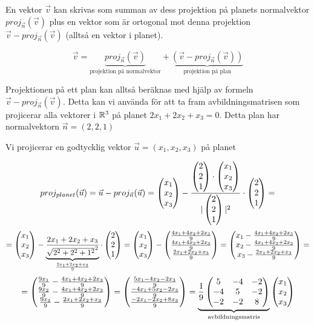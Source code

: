 \documentclass[../../main.tex]{subfiles}
\begin{document}
\begin{solution}{10}

En vektor $\vec{v}$ kan skrivas som summan av dess projektion på planets normalvektor $proj_{\vec{n}}(\vec{v})$ plus en vektor som är ortogonal mot denna projektion $\vec{v} - proj_{\vec{n}}(\vec{v})$ (alltså en vektor i planet). 

$$
\vec{v} = \underbrace{proj_{\vec{n}}(\vec{v})}_{\text{projektion på normalvektor}} + \underbrace{(\vec{v} - proj_{\vec{n}}(\vec{v}))}_{\text{projektion på plan}}
$$

Projektionen på ett plan kan alltså beräknas med hjälp av formeln $\vec{v} - proj_{\vec{n}}(\vec{v})$. Detta kan vi använda för att ta fram avbildningsmatrisen som projicerar alla vektorer i $\mathbb{R}^{3}$ på planet $2x_1 + 2x_2 + x_3 = 0$. Detta plan har normalvektorn $\vec{n} = (2, 2, 1)$

Vi projicerar en godtycklig vektor $\vec{u} = (x_1, x_2, x_3)$ på planet

$$
proj_{planet}(\vec{u}) = \vec{u} - proj_{\vec{n}}(\vec{u}) = \begin{pmatrix}x_1\\x_2\\x_3\end{pmatrix} - \frac{\begin{pmatrix}2\\2\\1\end{pmatrix}\cdot \begin{pmatrix}x_1\\x_2\\x_3\end{pmatrix}}{|\begin{pmatrix}2\\2\\1\end{pmatrix}|^2} \cdot \begin{pmatrix}2\\2\\1\end{pmatrix} =
$$
$$
= \begin{pmatrix}x_1\\x_2\\x_3\end{pmatrix} - \underbrace{\frac{2x_1 + 2x_2 + x_3}{\sqrt{2^2 + 2^2 + 1^2}^2}}_{\frac{2x_1 + 2x_2 + x_3}{9}}\cdot \begin{pmatrix}2\\2\\1\end{pmatrix} = \begin{pmatrix}x_1\\x_2\\x_3\end{pmatrix} - \begin{pmatrix}\frac{4x_1 + 4x_2 + 2x_3}{9}\\\frac{4x_1 + 4x_2 + 2x_3}{9}\\\frac{2x_1 + 2x_2 + x_3}{9}\end{pmatrix} = \begin{pmatrix}x_1 - \frac{4x_1 + 4x_2 + 2x_3}{9}\\ x_2 - \frac{4x_1 + 4x_2 + 2x_3}{9}\\x_3 - \frac{2x_1 + 2x_2 + x_3}{9}\end{pmatrix} = 
$$
$$
= \begin{pmatrix}\frac{9x_1}{9} - \frac{4x_1 + 4x_2 + 2x_3}{9}\\ \frac{9x_2}{9} - \frac{4x_1 + 4x_2 + 2x_3}{9}\\\frac{9x_3}{9} - \frac{2x_1 + 2x_2 + x_3}{9}\end{pmatrix} = \begin{pmatrix}\frac{5x_1 - 4x_2 - 2x_3}{9}\\ \frac{-4x_1 + 5x_2 - 2x_3}{9}\\ \frac{-2x_1 - 2x_2 + 8x_3}{9}\end{pmatrix} = \underbrace{\frac{1}{9}\begin{pmatrix}
5&-4&-2\\
-4&5&-2\\
-2&-2&8
\end{pmatrix}}_{\text{avbildningsmatris}} \begin{pmatrix}x_1\\x_2\\x_3\end{pmatrix}
$$


\end{solution}
\end{document}
